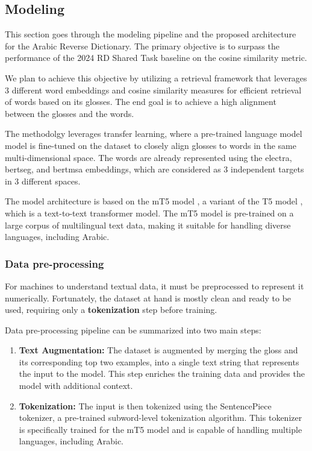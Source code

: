 \documentclass[12.5pt]{article}
\begin{document}
\newpage

\subsection{Modeling}

This section goes through the modeling pipeline and the proposed architecture for the Arabic Reverse Dictionary. The primary objective is to surpass the performance of the 2024 RD Shared Task baseline on the cosine similarity metric. 

We plan to achieve this objective by utilizing a retrieval framework that leverages 3 different word embeddings and cosine similarity measures for efficient retrieval of words based on its glosses. The end goal is to achieve a high alignment between the glosses and the words.

The methodolgy leverages transfer learning, where a pre-trained language model model is fine-tuned on the dataset to closely align glosses to words in the same multi-dimensional space. The words are already represented using the electra, bertseg, and bertmsa embeddings, which are considered as 3 independent targets in 3 different spaces.

The model architecture is based on the mT5 model \cite{Linting2021}, a variant of the T5 model \cite{Raffel2019}, which is a text-to-text transformer model. The mT5 model is pre-trained on a large corpus of multilingual text data, making it suitable for handling diverse languages, including Arabic.

\subsubsection{Data pre-processing}

For machines to understand textual data, it must be preprocessed to represent it numerically. Fortunately, the dataset at hand is mostly clean and ready to be used, requiring only a \textbf{tokenization} step before training.

Data pre-processing pipeline can be summarized into two main steps:

\begin{enumerate}
    \item \textbf{Text Augmentation:} The dataset is augmented by merging the gloss and its corresponding top two examples, into a single text string that represents the input to the model. This step enriches the training data and provides the model with additional context.
    \item \textbf{Tokenization:} The input is then tokenized using the SentencePiece tokenizer, a pre-trained subword-level tokenization algorithm. This tokenizer is specifically trained for the mT5 model and is capable of handling multiple languages, including Arabic.
\end{enumerate}
\end{document}
